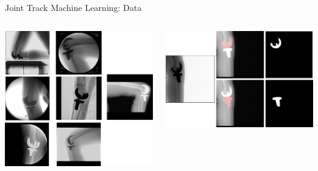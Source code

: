 \begin{frame}{Joint Track Machine Learning: Data}
   \centering
   \begin{columns}
      \begin{column}{0.4\linewidth}
         \includegraphics[width=\columnwidth]{images/jtml-data.png}
      \end{column}
      \begin{column}{0.6\linewidth}
         \includegraphics[width=\columnwidth]{images/jtml-segmentation.png}
      \end{column}
   \end{columns}
\end{frame}


